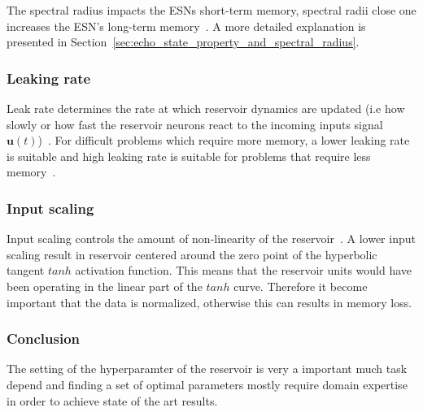 \documentclass{WitsPhysicsReport}
\begin{document}
The spectral radius impacts the ESNs short-term memory, spectral radii close one increases the ESN's long-term memory~\cite{lukovsevivcius2012practical}.  A more detailed explanation is presented in Section~\ref{sec:echo_state_property_and_spectral_radius}.

\subsubsection{Leaking rate}
\label{sec:leaking_rate}

Leak rate determines the rate at which reservoir  dynamics are updated (i.e how slowly or how fast the reservoir neurons react to the incoming inputs signal $\mathbf{u}(t)$)~\cite{lukovsevivcius2012practical, jaeger2007optimization}. For difficult problems which require more memory, a lower leaking rate is suitable and high leaking rate is suitable for problems that require less memory~\cite{Schaetti2015}. 

\subsubsection{Input scaling}
\label{sec:input_scaling}

Input scaling controls the amount of non-linearity of the reservoir~\cite{lukovsevivcius2012practical}. A lower input scaling result in reservoir centered around  the zero point of the hyperbolic tangent $tanh$ activation function. This  means that the reservoir units  would have  been operating in the  linear part of the  $tanh$ curve. Therefore it become important that the data is normalized, otherwise this can results in memory loss.

\subsubsection{Conclusion}
The setting of the hyperparamter of the reservoir is very a important much task depend and finding a set of optimal parameters mostly require domain expertise in order to achieve state of the art results. 

\end{document}
